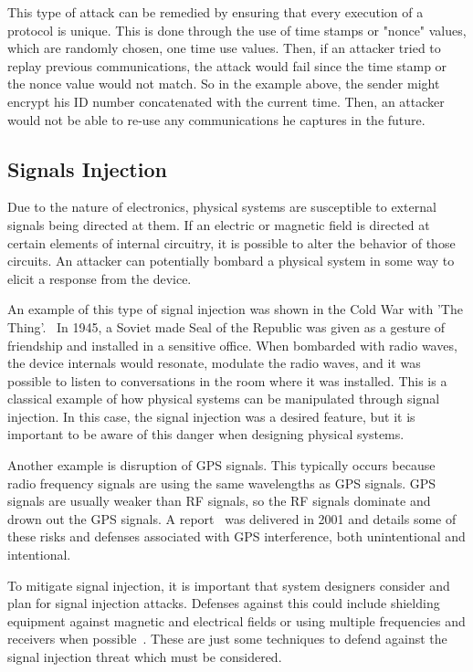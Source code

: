 This type of attack can be remedied by ensuring that every execution of a protocol is unique. This is done through the use of
time stamps or "nonce" values, which are randomly chosen, one time use values. Then, if an attacker tried to replay previous
communications, the attack would fail since the time stamp or the nonce value would not match. So in the example above, the
sender might encrypt his ID number concatenated with the current time. Then, an attacker would not be able to re-use any
communications he captures in the future.

\subsection{Signals Injection}
Due to the nature of electronics, physical systems are susceptible to external signals being directed at them. If an electric or 
magnetic field is directed at certain elements of internal circuitry, it is possible to alter the behavior of those circuits. An attacker
can potentially bombard a physical system in some way to elicit a response from the device.

An example of this type of signal injection was shown in the Cold War with 'The Thing'.~\cite{thing} In 1945, a Soviet made Seal of the 
Republic was given as a gesture of friendship and installed in a sensitive office. When bombarded with radio waves, the device internals
would resonate, modulate the radio waves, and it was possible to listen to conversations in the room where it was installed. This is a
classical example of how physical systems can be manipulated through signal injection. In this case, the signal injection was a desired
feature, but it is important to be aware of this danger when designing physical systems.

Another example is disruption of GPS signals. This typically occurs because radio frequency signals are using the same wavelengths as
GPS signals. GPS signals are usually weaker than RF signals, so the RF signals dominate and drown out the GPS signals. A report~\cite{gpsdisruption} 
was delivered in 2001 and details some of these risks and defenses associated with GPS interference, both unintentional and intentional.

To mitigate signal injection, it is important that system designers consider and plan for signal injection attacks. Defenses against this could
include shielding equipment against magnetic and electrical fields or using multiple frequencies and receivers when possible~\cite{gpsdisruption}.
These are just some techniques to defend against the signal injection threat which must be considered.

